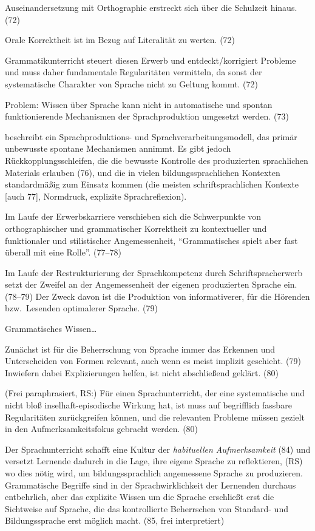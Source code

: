 Auseinandersetzung mit Orthographie erstreckt sich über die Schulzeit hinaus. (72)

Orale Korrektheit ist im Bezug auf Literalität zu werten. (72)

Grammatikunterricht steuert diesen Erwerb und entdeckt/korrigiert Probleme und muss daher fundamentale Regularitäten vermitteln, da sonst der systematische Charakter von Sprache nicht zu Geltung kommt. (72)

Problem: Wissen über Sprache kann nicht in automatische und spontan funktionierende Mechanismen der Sprachproduktion umgesetzt werden. (73)

\citet[75--79]{Portmanntselikas2011} beschreibt ein Sprachproduktions- und Sprachverarbeitungsmodell, das primär unbewusste spontane Mechanismen annimmt.
Es gibt jedoch Rückkopplungsschleifen, die die bewusste Kontrolle des produzierten sprachlichen Materials erlauben (76), und die in vielen bildungssprachlichen Kontexten standardmäßig zum Einsatz kommen (die meisten schriftsprachlichen Kontexte [auch 77], Normdruck, explizite Sprachreflexion).

Im Laufe der Erwerbskarriere verschieben sich die Schwerpunkte von orthographischer und grammatischer Korrektheit zu kontextueller und funktionaler und stilistischer Angemessenheit, "`Grammatisches spielt aber fast überall mit eine Rolle"'. (77--78)

Im Laufe der Restrukturierung der Sprachkompetenz durch Schriftspracherwerb setzt der Zweifel an der Angemessenheit der eigenen produzierten Sprache ein. (78--79)
Der Zweck davon ist die Produktion von informativerer, für die Hörenden bzw.\ Lesenden optimalerer Sprache. (79)

Grammatisches Wissen\ldots

Zunächst ist für die Beherrschung von Sprache immer das Erkennen und Unterscheiden von Formen relevant, auch wenn es meist implizit geschieht. (79)
Inwiefern dabei Explizierungen helfen, ist nicht abschließend geklärt. (80)

(Frei paraphrasiert, RS:) Für einen Sprachunterricht, der eine systematische und nicht bloß inselhaft-episodische Wirkung hat, ist muss auf begrifflich fassbare Regularitäten zurückgreifen können, und die relevanten Probleme müssen gezielt in den Aufmerksamkeitsfokus gebracht werden. (80)

Der Sprachunterricht schafft eine Kultur der \textit{habituellen Aufmerksamkeit} (84) und versetzt Lernende dadurch in die Lage, ihre eigene Sprache zu reflektieren, (RS) wo dies nötig wird, um bildungssprachlich angemessene Sprache zu produzieren.
Grammatische Begriffe sind in der Sprachwirklichkeit der Lernenden durchaus entbehrlich, aber das explizite Wissen um die Sprache erschließt erst die Sichtweise auf Sprache, die das kontrollierte Beherrschen von Standard- und Bildungssprache erst möglich macht. (85, frei interpretiert)

